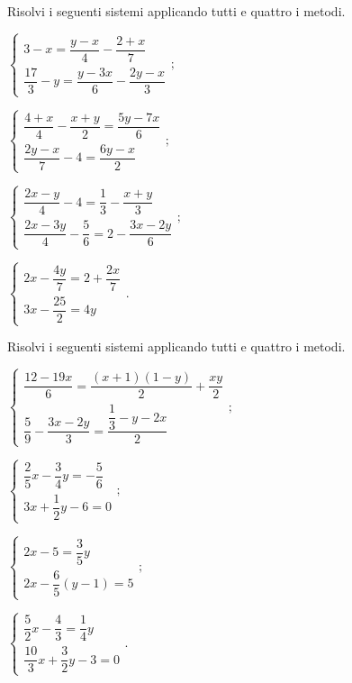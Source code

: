 \begin{esercizio}[\Ast]
 \label{ese:19.31}
Risolvi i seguenti sistemi applicando tutti e quattro i metodi.
\begin{multicols}{2}
\begin{enumeratea}{\longarray
\item $\left\{\begin{array}{l}3-x=\dfrac{y-x}{4}-\dfrac{2+x}{7}\\\dfrac{17}{3}-y=\dfrac{y-3x}{6}-\dfrac{2y-x}{3}\end{array}\right.;$
\item $\left\{\begin{array}{l}\dfrac{4+x}{4}-\dfrac{x+y}{2}=\dfrac{5y-7x}{6}\\\dfrac{2y-x}{7}-4=\dfrac{6y-x}{2}\end{array}\right.;$
\item $\left\{\begin{array}{l}\dfrac{2x-y}{4}-4=\dfrac{1}{3}-\dfrac{x+y}{3}\\\dfrac{2x-3y}{4}-\dfrac{5}{6}=2-\dfrac{3x-2y}{6}\end{array}\right.;$
\item $\left\{\begin{array}{l}2x-\dfrac{4y}{7}=2+\dfrac{2x}{7}\\3x-\dfrac{25}{2}=4y\end{array}\right..$}
\end{enumeratea}
\end{multicols}
\end{esercizio}

\begin{esercizio}[\Ast] %
 \label{ese:19.32}
Risolvi i seguenti sistemi applicando tutti e quattro i metodi.
\begin{multicols}{2}
\begin{enumeratea}{\longarray
\item $\left\{\begin{array}{l}\dfrac{12-19x}{6}=\dfrac{(x+1)(1-y)}{2}+\dfrac{xy}{2}\\\dfrac{5}{9}-\dfrac{3x-2y}{3}=\dfrac{\dfrac{1}{3}-y-2x}{2}\end{array}\right.;$
\item $\left\{\begin{array}{l}\dfrac{2}{5}x-\dfrac{3}{4}y=-\dfrac{5}{6}\\3x+\dfrac{1}{2}y-6=0\end{array}\right.;$
\item $\left\{\begin{array}{l}2x-5=\dfrac{3}{5}y\\2x-\dfrac{6}{5}(y-1)=5\end{array}\right.;$
\item $\left\{\begin{array}{l}\dfrac{5}{2}x-\dfrac{4}{3}=\dfrac{1}{4}y\\\dfrac{10}{3}x+\dfrac{3}{2}y-3=0\end{array}\right..$}
\end{enumeratea}
\end{multicols}
\end{esercizio}

